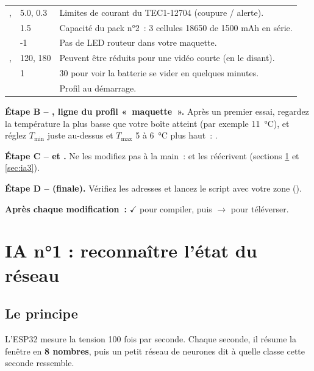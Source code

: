 \begin{tabularx}{\linewidth}{P{4.4cm}P{2.6cm}L}
,  & 5.0, 0.3 & Limites de courant du TEC1-12704 (coupure / alerte). \\
 & 1.5 & Capacité du pack n°2~: 3 cellules 18650 de 1500 mAh en série. \\
 & -1 & Pas de LED routeur dans votre maquette. \\
,  & 120, 180 & Peuvent être réduits pour une vidéo courte (en le disant). \\
 & 1 & 30 pour voir la batterie se vider en quelques minutes. \\
 &  & Profil au démarrage. \\
\end{tabularx}

\textbf{Étape B -- , ligne du profil «~maquette~».} Après un premier essai, regardez la température la plus basse que votre boîte atteint (par exemple 11~°C), et réglez $T_{\min}$ juste au-dessus et $T_{\max}$ 5 à 6~°C plus haut~: .

\textbf{Étape C --  et .} Ne les modifiez pas à la main~:  et  les réécrivent (sections \ref{sec:ia1} et \ref{sec:ia3}).

\textbf{Étape D --  (finale).} Vérifiez les adresses  et lancez le script avec votre zone ().

\textbf{Après chaque modification~:} \textbf{$\checkmark$} pour compiler, puis \textbf{$\rightarrow$} pour téléverser.

\section{IA n°1 : reconnaître l'état du réseau}\label{sec:ia1}

\subsection{Le principe}
L'ESP32 mesure la tension 100 fois par seconde. Chaque seconde, il résume la fenêtre en \textbf{8 nombres}, puis un petit réseau de neurones dit à quelle classe cette seconde ressemble.

